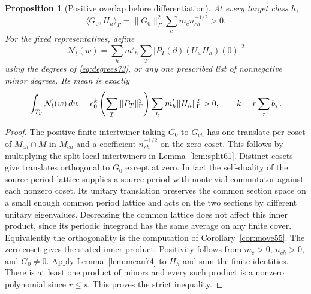 \documentclass[a4paper,11pt]{article}
\newtheorem{proposition}{Proposition}[section]
\theoremstyle{definition}
\theoremstyle{remark}
\numberwithin{equation}{section}
\begin{document}
\begin{proposition}[Positive overlap before differentiation]\label{prop:overlap74}
At every target class \(h\),
\[
  \langle G_0,H_h\rangle_\Gamma
      =\|G_0\|_\Gamma^2\sum_c m_c n_{ch}^{-1/2}>0 .
\]
For the fixed representatives, define
\[
       \mathcal N_t(w)=\sum_hm'_h\sum_T
                  |P_T(\partial)(U_wH_h)(0)|^2
\]
using the degrees of \eqref{eq:degrees73}, or any one prescribed
list of nonnegative minor degrees. Its mean is exactly
\begin{equation}
 \int_{T_\Gamma}\mathcal N_t(w)\,dw
       = c_0^k\left(\sum_T\|P_T\|_{\rm F}^2\right)
                       \sum_h m'_h\|H_h\|_\Gamma^2 >0,
             \qquad k=r\sum_\tau b_\tau .                 \label{eq:positive74}
\end{equation}
\end{proposition}
\begin{proof}
The positive finite intertwiner taking \(G_0\) to \(G_{ch}\)
has one translate per coset of \(M_{ch}\cap M\) in \(M_{ch}\)
and a coefficient \(n_{ch}^{-1/2}\) on the zero coset.
This follows by multiplying the split local intertwiners in
Lemma~\ref{lem:split61}. Distinct cosets give translates
orthogonal to \(G_0\) except at zero. In fact the self-duality
of the source period lattice supplies a source period with
nontrivial commutator against each nonzero coset. Its unitary
translation preserves the common section space on a small enough
common period lattice and acts on the two sections by different
unitary eigenvalues. Decreasing the common lattice does not
affect this inner product, since its periodic integrand has the
same average on any finite cover. Equivalently the orthogonality
is the computation of Corollary~\ref{cor:move55}.
The zero coset gives the stated inner product. Positivity follows
from \(m_c>0\), \(n_{ch}>0\), and \(G_0\ne0\).
Apply Lemma~\ref{lem:mean74} to \(H_h\) and sum the finite
identities. There is at least one product of minors and every
such product is a nonzero polynomial since \(r\le s\). This
proves the strict inequality.
\end{proof}
\end{document}

